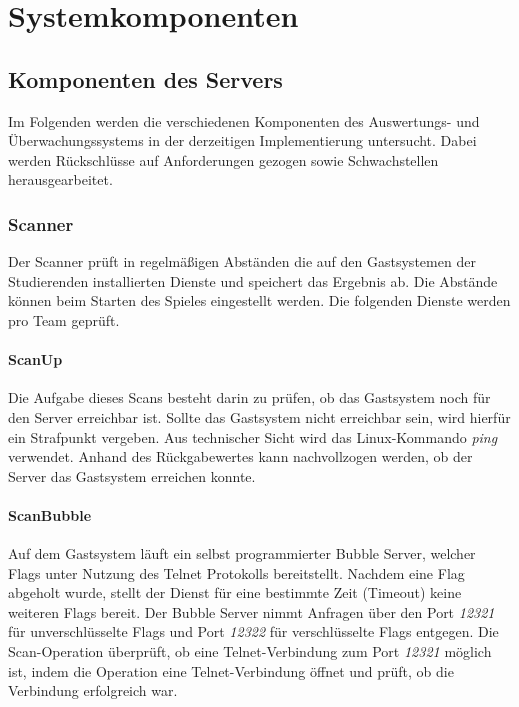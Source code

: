\section{Systemkomponenten}\label{sec:Systemkomponenten}

\subsection{Komponenten des Servers}\label{subsec:Komponente_des_Servers}
Im Folgenden werden die verschiedenen Komponenten des Auswertungs- und Überwachungssystems in der derzeitigen Implementierung untersucht. Dabei werden Rückschlüsse auf Anforderungen gezogen sowie Schwachstellen herausgearbeitet.

\subsubsection{Scanner}\label{subsubsec:Scanner}
Der Scanner prüft in regelmäßigen Abständen die auf den Gastsystemen der Studierenden installierten Dienste und speichert das Ergebnis ab. Die Abstände können beim Starten des Spieles eingestellt werden. Die folgenden Dienste werden pro Team geprüft.

\paragraph{ScanUp}\label{para:ScanUp}
Die Aufgabe dieses Scans besteht darin zu prüfen, ob das Gastsystem noch für den Server erreichbar ist. Sollte das Gastsystem nicht erreichbar sein, wird hierfür ein Strafpunkt vergeben. Aus technischer Sicht wird das Linux-Kommando \textit{ping} verwendet. Anhand des Rückgabewertes kann nachvollzogen werden, ob der Server das Gastsystem erreichen konnte.

\paragraph{ScanBubble}\label{para:ScanBubble}
Auf dem Gastsystem läuft ein selbst programmierter Bubble Server, welcher Flags unter Nutzung des Telnet Protokolls bereitstellt. Nachdem eine Flag abgeholt wurde, stellt der Dienst für eine bestimmte Zeit (Timeout) keine weiteren Flags bereit. Der Bubble Server nimmt Anfragen über den Port \textit{12321} für unverschlüsselte Flags und Port \textit{12322} für verschlüsselte Flags entgegen. Die Scan-Operation überprüft, ob eine Telnet-Verbindung zum Port \textit{12321} möglich ist, indem die Operation eine Telnet-Verbindung öffnet und prüft, ob die Verbindung erfolgreich war.

